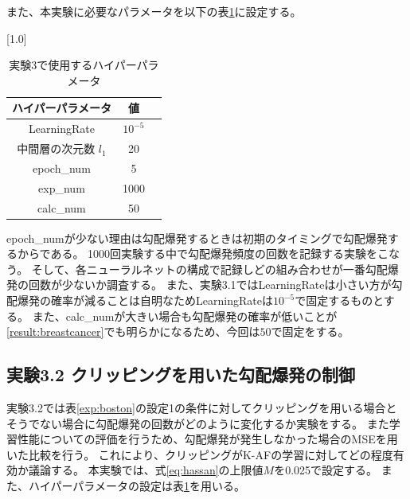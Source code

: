 また、本実験に必要なパラメータを以下の表\ref{exp31hyper}に設定する。


\begin{table}[hbtp]
    \begin{center}
        \caption{実験3で使用するハイパーパラメータ}
        \label{exp31hyper}
        \vspace{2mm} 
        \scalebox{1.0}[1.0]{
            \begin{tabular}{||c|c|c||}
            \hline
            ハイパーパラメータ  & 値 \\
            \hline
            LearningRate & $ 10^{-5} $ \\
            \hline
            中間層の次元数 $ l_1 $ & 20  \\
            \hline
            epoch\_num & 5  \\
            \hline
            exp\_num & 1000 \\
            \hline
            calc\_num & 50  \\
            \hline
            \end{tabular}
        }
    \end{center}
\end{table}

epoch\_numが少ない理由は勾配爆発するときは初期のタイミングで勾配爆発するからである。
1000回実験する中で勾配爆発頻度の回数を記録する実験をこなう。
そして、各ニューラルネットの構成で記録しどの組み合わせが一番勾配爆発の回数が少ないか調査する。
また、実験3.1ではLearningRateは小さい方が勾配爆発の確率が減ることは自明なためLearningRateは$ 10^{-5} $で固定するものとする。
また、calc\_numが大きい場合も勾配爆発の確率が低いことが\ref{result:breastcancer}でも明らかになるため、今回は$ 50 $で固定をする。



\subsection{実験3.2 クリッピングを用いた勾配爆発の制御}
\label{exp3.2}
実験3.2では表\ref{exp:boston}の設定1の条件に対してクリッピングを用いる場合とそうでない場合に勾配爆発の回数がどのように変化するか実験をする。
また学習性能についての評価を行うため、勾配爆発が発生しなかった場合のMSEを用いた比較を行う。
これにより、クリッピングがK-AFの学習に対してどの程度有効か議論する。
本実験では、式\ref{eq:hassan}の上限値$ M $を0.025で設定する。
また、ハイパーパラメータの設定は表\ref{exp31hyper}を用いる。


